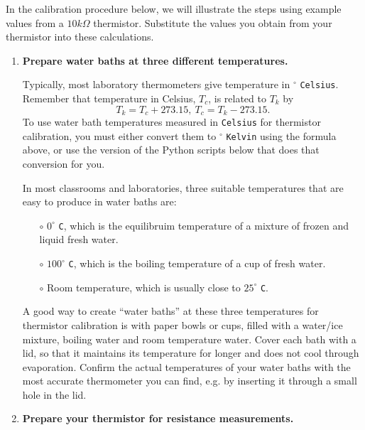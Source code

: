 In the calibration procedure below, we will illustrate the steps using example values from a $10k\Omega$ thermistor. 
Substitute the values you obtain from your thermistor into these calculations.
\begin{enumerate}
	\item \textbf{Prepare water baths at three different temperatures.}
	
	Typically, most laboratory thermometers give temperature in $^\circ$ \texttt{Celsius}.
	Remember that temperature in Celsius, $T_c$, is related to $T_k$ by 
	\begin{equation*}
		T_k = T_c + 273.15, ~T_c = T_k - 273.15.
	\end{equation*}
	To use water bath temperatures measured in \texttt{Celsius} for thermistor calibration, you must either convert them to $^\circ$ \texttt{Kelvin} using the formula above, or use the version of the Python scripts below that does that conversion for you.
	
	\smallskip
	In most classrooms and laboratories, three suitable temperatures that are easy to produce in water baths are:
	\begin{itemize}
		\item[$\circ$] $0^\circ$ \texttt{C}, which is the equilibruim temperature of a mixture of frozen and liquid fresh water. 		
		\item[$\circ$] $100^\circ$ \texttt{C}, which is the boiling temperature of a cup of fresh water. 
		\item[$\circ$] Room temperature, which is usually close to $25^\circ$ \texttt{C}.
	\end{itemize} 

	A good way to create ``water baths'' at these three temperatures for thermistor calibration is with paper bowls or cups, filled with a water/ice mixture, boiling water and room temperature water.
	Cover each bath with a lid, so that it maintains its temperature for longer and does not cool through evaporation. 
	Confirm the actual temperatures of your water baths with the most accurate thermometer you can find, e.g. by inserting it through a small hole in the lid.
	
	\item \textbf{Prepare your thermistor for resistance measurements.}
	

\end{enumerate}
